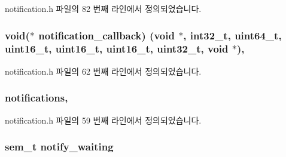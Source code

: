notification.\+h 파일의 82 번째 라인에서 정의되었습니다.

\subsubsection[{\texorpdfstring{notification\+\_\+callback}{notification_callback}}]{\setlength{\rightskip}{0pt plus 5cm}void($\ast$ notification\+\_\+callback) (void $\ast$, {\bf int32\+\_\+t}, {\bf uint64\+\_\+t}, uint16\+\_\+t, uint16\+\_\+t, uint16\+\_\+t, {\bf uint32\+\_\+t}, void $\ast$)\hspace{0.3cm}{\ttfamily [protected]}, {\ttfamily [inherited]}}\hypertarget{classavdecc__lib_1_1notification_a0aaf6a2e3f6d6e3fb6b416e9c2f7f6e9}{}\label{classavdecc__lib_1_1notification_a0aaf6a2e3f6d6e3fb6b416e9c2f7f6e9}


notification.\+h 파일의 62 번째 라인에서 정의되었습니다.

\subsubsection[{\texorpdfstring{notifications}{notifications}}]{ {\bf notifications}\hspace{0.3cm}{\ttfamily [protected]}, {\ttfamily [inherited]}}\hypertarget{classavdecc__lib_1_1notification_a02a497f6526df74aec4060942683da34}{}\label{classavdecc__lib_1_1notification_a02a497f6526df74aec4060942683da34}


notification.\+h 파일의 59 번째 라인에서 정의되었습니다.

\subsubsection[{\texorpdfstring{notify\+\_\+waiting}{notify_waiting}}]{\setlength{\rightskip}{0pt plus 5cm}sem\+\_\+t notify\+\_\+waiting\hspace{0.3cm}{\ttfamily [private]}}\hypertarget{classavdecc__lib_1_1notification__imp_a5e84b919a152418fd41a1c1a7b18d547}{}\label{classavdecc__lib_1_1notification__imp_a5e84b919a152418fd41a1c1a7b18d547}


